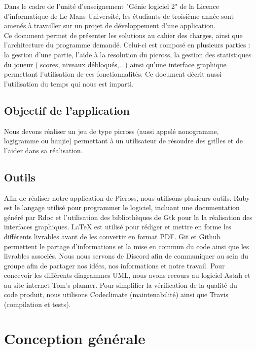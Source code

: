 \documentclass{report}
\begin{document}
		Dans le cadre de l'unité d'enseignement "Génie logiciel 2" de la Licence d'informatique de Le Mans Université, les étudiants de troisième année sont amenés à travailler sur un projet de développement d'une application. \\
		Ce document permet de présenter les solutions au cahier des charges, ainsi que l'architecture du programme demandé. Celui-ci est composé en plusieurs parties : la gestion d'une partie, l'aide à la resolution du picross, la gestion des statistiques du joueur ( scores, niveaux débloqués,...) ainsi qu'une interface graphique permettant l'utilisation de ces fonctionnalités. Ce document décrit aussi l'utilisation du temps qui nous est imparti. 

	
 	\section{Objectif de l'application}		
		Nous devons réaliser un jeu de type picross (aussi appelé nonogramme, logigramme ou hanjie) permettant à un utilisateur de résoudre des grilles et de l'aider dans sa réalisation.
		
		\section{Outils}
		
		Afin de réaliser notre application de Picross, nous utilisons plusieurs outils. Ruby est le langage utilisé pour programmer le logiciel, incluant une documentation généré par Rdoc et l'utilisation des bibliothèques de Gtk pour la la réalisation des interfaces graphiques.
LaTeX est utilisé pour rédiger et mettre en forme les différents livrables avant de les convertir en format PDF.
Git et Github permettent le partage d'informations et la mise en commun du code ainsi que les livrables associés. Nous nous servons de Discord afin de communiquer au sein du groupe afin de partager nos idées, nos informations et notre travail.
Pour concevoir les différents diagrammes UML, nous avons recours au logiciel Astah et au site internet Tom's planner.
Pour simplifier la vérification de la qualité du code produit, nous utilisons Codeclimate (maintenabilité) ainsi que Travis (compilation et tests).

		
\chapter{Conception générale}
\end{document}
